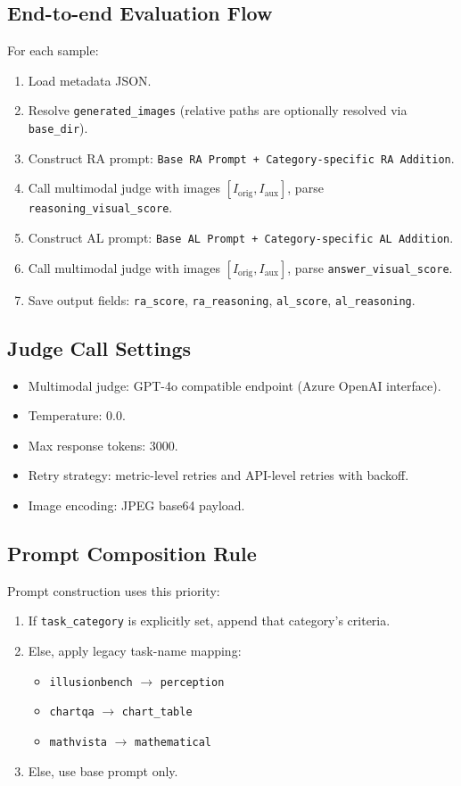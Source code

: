 \documentclass{article}
\theoremstyle{plain}
\theoremstyle{definition}
\theoremstyle{remark}
\begin{document}
\subsection{End-to-end Evaluation Flow}
For each sample:
\begin{enumerate}
\item Load metadata JSON.
\item Resolve \texttt{generated\_images} (relative paths are optionally resolved via \texttt{base\_dir}).
\item Construct RA prompt: \texttt{Base RA Prompt + Category-specific RA Addition}.
\item Call multimodal judge with images \([I_{\text{orig}}, I_{\text{aux}}]\), parse \texttt{reasoning\_visual\_score}.
\item Construct AL prompt: \texttt{Base AL Prompt + Category-specific AL Addition}.
\item Call multimodal judge with images \([I_{\text{orig}}, I_{\text{aux}}]\), parse \texttt{answer\_visual\_score}.
\item Save output fields:
\texttt{ra\_score}, \texttt{ra\_reasoning}, \texttt{al\_score}, \texttt{al\_reasoning}.
\end{enumerate}

\subsection{Judge Call Settings}
\begin{itemize}
\item Multimodal judge: GPT-4o compatible endpoint (Azure OpenAI interface).
\item Temperature: \(0.0\).
\item Max response tokens: \(3000\).
\item Retry strategy: metric-level retries and API-level retries with backoff.
\item Image encoding: JPEG base64 payload.
\end{itemize}

\subsection{Prompt Composition Rule}
Prompt construction uses this priority:
\begin{enumerate}
\item If \texttt{task\_category} is explicitly set, append that category's criteria.
\item Else, apply legacy task-name mapping:
\begin{itemize}
\item \texttt{illusionbench} \(\rightarrow\) \texttt{perception}
\item \texttt{chartqa} \(\rightarrow\) \texttt{chart\_table}
\item \texttt{mathvista} \(\rightarrow\) \texttt{mathematical}
\end{itemize}
\item Else, use base prompt only.
\end{enumerate}
\end{document}
